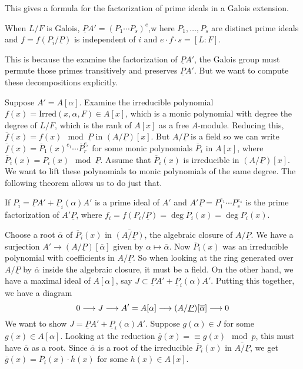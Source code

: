 This gives a formula for the factorization of prime ideals in a Galois extension. 


\begin{cor}
When $L/F$ is Galois, $\underline{P}A'=(P_1\cdots P_s)^e$,w here $P_1,\ldots,P_s$ are distinct prime ideals and $f=f(P_i/\underline{P})$ is independent of $i$ and $e \cdot f\cdot s=[L:F]$.
\end{cor}


This is because the examine the factorization of $\underline{P}A'$, the Galois group must permute those primes transitively and preserves $\underline{P}A'$. But we want to compute these decompositions explicitly. 


\begin{ex}
Suppose $A'=A[\alpha]$. Examine the irreducible polynomial $f(x)=\text{Irred}(x,\alpha,F) \in A[x]$, which is a monic polynomial with degree the degree of $L/F$, which is the rank of $A[x]$ as a free $A$-module. Reducing this, $\overline{f}(x)= f(x) \mod \underline{P}$ in $(A/\underline{P})[x]$. But $A/\underline{P}$ is a field so we can write $\overline{f}(x)= \overline{P}_1(x)^{e_1} \cdots \overline{P}_r^{e_r}$ for some monic polynomials $\overline{P}_i$ in $A[x]$, where $\overline{P}_i(x)=P_i(x) \mod \underline{P}$. Assume that $\overline{P}_i(x)$ is irreducible in $(A/\underline{P})[x]$. We want to lift these polynomials to monic polynomials of the same degree. The following theorem allows us to do just that.
\end{ex}


\begin{thm}
If $P_i= \underline{P}A' + \underline{P}_i(\alpha)A'$ is a prime ideal of $A'$ and $A'\underline{P}=P_1^{e_1}\cdots P_s^{e_s}$ is the prime factorization of $A'\underline{P}$, where $f_i=f(P_i/\underline{P})=\deg \overline{P}_i(x)=\deg P_i(x)$.
\end{thm}

\pf Choose a root $\overline{\alpha}$ of $\overline{P}_i(x)$ in $\overline{(A/\underline{P})}$, the algebraic closure of $A/\underline{P}$. We have a surjection $A' \to (A/\underline{P})[\overline{\alpha}]$ given by $\alpha \mapsto \overline{\alpha}$. Now $\overline{P}_i(x)$ was an irreducible polynomial with coefficients in $A/\underline{P}$. So when looking at the ring generated over $A/\underline{P}$ by $\overline{\alpha}$ inside the algebraic closure, it must be a field. On the other hand, we have a maximal ideal of $A[\alpha]$, say $J \subset \underline{P}A' + \underline{P}_i(\alpha)A'$. Putting this together, we have a diagram
	\[
	0 \stackrel{}{\longrightarrow} J \stackrel{}{\longrightarrow} A'=A[\alpha] \stackrel{}{\longrightarrow} (A/\underline{P})[\overline{\alpha}] \stackrel{}{\longrightarrow} 0
	\]
We want to show $J=\underline{P}A' + \underline{P}_i(\alpha)A'$. Suppose $g(\alpha) \in J$ for some $g(x) \in A[\alpha]$. Looking at the reduction $\overline{g}(x) = \equiv g(x) \mod p$, this must have $\overline{\alpha}$ as a root. Since $\overline{\alpha}$ is a root of the irreducible $\overline{P}_i(x)$ in $\overline{A/\underline{P}}$, we get $\overline{g}(x)=\overline{P}_i(x) \cdot \overline{h}(x)$ for some $h(x) \in A[x]$. 

